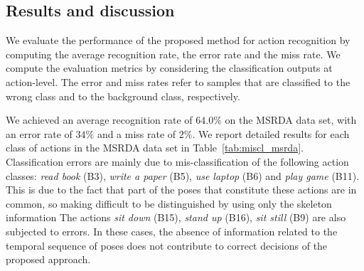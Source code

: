 \documentclass[runningheads,a4paper]{llncs}
\begin{document}
\subsection{Results and discussion}

We evaluate the performance of the proposed method for action recognition by computing the average recognition rate, the error rate and the miss rate.  We compute the evaluation metrics by considering the classification outputs at action-level. The error and miss rates refer to samples that are classified to the wrong class and to the background class, respectively.

We achieved an average recognition rate of $64.0\%$ on the MSRDA data set, with an error rate of $34\%$ and a miss rate of $2\%$. We report detailed results for each class of actions in the MSRDA data set in Table~\ref{tab:miscl_msrda}. 
Classification errors are mainly due to mis-classification of the following action classes: \emph{read book} (B3), \emph{write a paper} (B5), \emph{use laptop} (B6) and \emph{play game} (B11). This is due to the fact that part of the poses that constitute these actions are in common, so making difficult to be distinguished by using only the skeleton information
The actions \emph{sit down} (B15), \emph{stand up} (B16), \emph{sit still} (B9) are also subjected to errors. In these cases, the absence of information related to the temporal sequence of poses does not contribute to correct decisions of the proposed approach.
\end{document}
